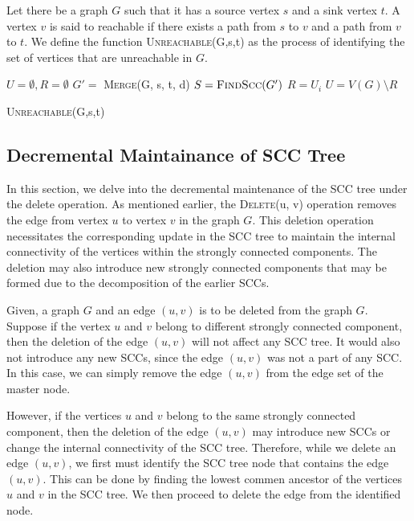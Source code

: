 Let there be a graph $G$ such that it has a source vertex $s$ and a sink vertex $t$.
A vertex $v$ is said to reachable if there exists a path from $s$ to $v$ and a path from $v$ to $t$.
We define the function \textsc{Unreachable}(G,s,t) as the process of identifying the set of vertices that are unreachable in $G$.

\begin{algorithm}
    \SetAlgoLined
    $U = \emptyset, R = \emptyset$\;
    $G' =$ \textsc{Merge}(G, s, t, d)\;
    $S = \text{\textsc{FindScc}}(G')$\;
     {
         {
            $R = U_i$
        }
    }
    $U = V(G) \setminus R$\;
    \caption{\textsc{Unreachable}(G,s,t)}
\end{algorithm}




\subsection{Decremental Maintainance of SCC Tree}\label{Subsec: Decremental Maintaince of SCC Tree}

In this section, we delve into the decremental maintenance of the SCC tree under the delete operation.
As mentioned earlier, the \textsc{Delete}(u, v) operation removes the edge from vertex $u$ to vertex $v$ in the graph $G$.
This deletion operation necessitates the corresponding update in the SCC tree to maintain the internal connectivity of the vertices within the strongly connected components.
The deletion may also introduce new strongly connected components that may be formed due to the decomposition of the earlier SCCs.

Given, a graph $G$ and an edge $(u, v)$ is to be deleted from the graph $G$. Suppose if the vertex $u$ and $v$ belong to different strongly connected component, 
then the deletion of the edge $(u, v)$ will not affect any SCC tree. It would also not introduce any new SCCs, since the edge $(u, v)$ was not a part of any SCC.
In this case, we can simply remove the edge $(u, v)$ from the edge set of the master node.

However, if the vertices $u$ and $v$ belong to the same strongly connected component, then the deletion of the edge $(u, v)$ may introduce new SCCs or change the internal connectivity of the SCC tree.
Therefore, while we delete an edge $(u, v)$, we first must identify the SCC tree node that contains the edge $(u, v)$. This can be done by 
finding the lowest commen ancestor of the vertices $u$ and $v$ in the SCC tree. We then proceed to delete the edge from the identified node.

